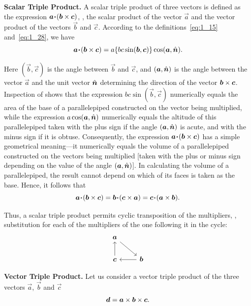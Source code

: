 \textbf{Scalar Triple Product.} A scalar triple product of three vectors is defined as the expression $\boldsymbol{a}\!\boldsymbol{\cdot}\!(\boldsymbol{b}\times\boldsymbol{c})$, \ie, the scalar product of the vector $\vec{a}$ and the vector product of the vectors $\vec{b}$ and $\vec{c}$. According to the definitions~\eqref{eq:1_15} and~\eqref{eq:1_28}, we have
\begin{equation*}
\boldsymbol{a}\!\boldsymbol{\cdot}\!(\boldsymbol{b}\times\boldsymbol{c}) = a\{bc\sin(\boldsymbol{b}, \boldsymbol{c})\}\cos(\boldsymbol{a},\hat{\boldsymbol{n}}).
\end{equation*}

\noindent
Here $(\vec{b},\vec{c})$ is the angle between $\vec{b}$ and $\vec{c}$, and $(\boldsymbol{a},\hat{\boldsymbol{n}})$ is the angle between the vector $\vec{a}$ and the unit vector $\hat{\boldsymbol{n}}$ determining the direction of the vector $\boldsymbol{b}\times\boldsymbol{c}$. Inspection of  shows that the expression $bc\sin(\vec{b},\vec{c})$ numerically equals the area of the base of a parallelepiped constructed on the vector being multiplied, while the expression $a\cos(\boldsymbol{a},\hat{\boldsymbol{n}})$ numerically equals the altitude of this parallelepiped taken with the plus sign if the angle $(\boldsymbol{a},\hat{\boldsymbol{n}})$ is acute, and with the minus sign if it is obtuse. Consequently, the expression $\boldsymbol{a}\!\boldsymbol{\cdot}\!(\boldsymbol{b}\times\boldsymbol{c})$ has a simple geometrical meaning---it numerically equals the volume of a parallelepiped constructed on the vectors being multiplied [taken with the plus or minus sign depending on the value of the angle $(\boldsymbol{a},\hat{\boldsymbol{n}})$]. In calculating the volume of a parallelepiped, the result cannot depend on which of its faces is taken as the base. Hence, it follows that
\begin{equation}\label{eq:1_34}
\boldsymbol{a}\!\boldsymbol{\cdot}\!(\boldsymbol{b}\times\boldsymbol{c}) = \boldsymbol{b}\!\boldsymbol{\cdot}\!(\boldsymbol{c}\times\boldsymbol{a}) = \boldsymbol{c}\!\boldsymbol{\cdot}\!(\boldsymbol{a}\times\boldsymbol{b}).
\end{equation}

\noindent
Thus, a scalar triple product permits cyclic transposition of the multipliers, \ie, substitution for each of the multipliers of the one following it in the cycle:
\begin{equation*}
\begin{tikzcd}
\vec{a}\arrow[rd] &\\
\vec{c}\arrow[u] & \arrow[l] \vec{b}
\end{tikzcd}
\end{equation*}

\textbf{Vector Triple Product.} Let us consider a vector triple product of the three vectors $\vec{a}$, $\vec{b}$ and $\vec{c}$
\begin{equation*}
\boldsymbol{d} = \boldsymbol{a}\times\boldsymbol{b}\times\boldsymbol{c}.
\end{equation*}

